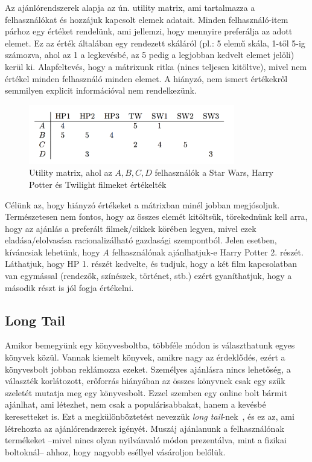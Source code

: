\documentclass[a4paper,12pt]{article}
\begin{document}
Az ajánlórendszerek alapja az ún. utility matrix, ami tartalmazza a felhasználókat és hozzájuk kapcsolt elemek adatait. Minden felhasználó-item párhoz egy értéket rendelünk, ami jellemzi, hogy mennyire preferálja az adott elemet. Ez az érték általában egy rendezett skáláról (pl.: 5 elemű skála, 1-től 5-ig számozva, ahol az 1 a legkevésbé, az 5 pedig a legjobban kedvelt elemet jelöli) kerül ki. Alapfeltevés, hogy a mátrixunk ritka (nincs teljesen kitöltve), mivel nem értékel minden felhasználó minden elemet. A hiányzó, nem ismert értékekről semmilyen explicit információval nem rendelkezünk.

\begin{figure}[ht!]
\centering
\includegraphics[width=90mm]{img/um.png}
\caption{Utility matrix, ahol az $A,B, C, D$ felhasználók a Star Wars, Harry Potter és Twilight filmeket értékelték \label{um}}
\end{figure}

Célünk az, hogy hiányzó értékeket a mátrixban minél jobban megjósoljuk. Természetesen nem fontos, hogy az összes elemét kitöltsük, törekednünk kell arra, hogy az ajánlás a preferált filmek/cikkek körében legyen, mivel ezek eladása/elolvasása racionalizálható gazdasági szempontból. Jelen esetben, kíváncsiak lehetünk, hogy $A$ felhasználónak ajánlhatjuk-e Harry Potter 2. részét. Láthatjuk, hogy HP 1. részét kedvelte, és tudjuk, hogy a két film kapcsolatban van egymással (rendezők, színészek, történet, stb.) ezért gyaníthatjuk, hogy a második részt is jól fogja értékelni.

\subsection{Long Tail}

Amikor bemegyünk egy könyvesboltba, többféle módon is választhatunk egyes könyvek közül. Vannak kiemelt könyvek, amikre nagy az érdeklődés, ezért a könyvesbolt jobban reklámozza ezeket. Személyes ajánlásra nincs lehetőség, a választék korlátozott, erőforrás hiányában az összes könyvnek csak egy szűk szeletét mutatja meg egy könyvesbolt. Ezzel szemben egy online bolt bármit ajánlhat, ami létezhet, nem csak a populárisabbakat, hanem a kevésbé keresetteket is. Ezt a megkülönböztetést nevezzük \textsl{long tail}-nek~\cite{longtail}, és ez az, ami létrehozta az ajánlórendszerek igényét. Muszáj ajánlanunk a felhasználónak termékeket --mivel nincs olyan nyilvánvaló módon prezentálva, mint a fizikai boltoknál-- ahhoz, hogy nagyobb eséllyel vásároljon belőlük.
\end{document}
